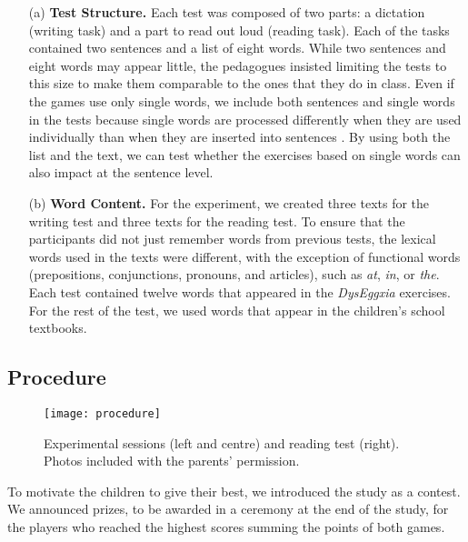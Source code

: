\documentclass[letterpaper]{sig-alternate-2013}
\begin{document}
\begin{itemize}
\item[(a)] {\bf Test Structure.} Each test was composed of two parts: a dictation (writing task) and a part to read out loud (reading task). Each of the tasks contained two sentences and a list of eight words.
While two sentences and eight words may appear little, the pedagogues insisted limiting the tests to this size to make them comparable to the ones that they do in class.
Even if the games use only single words, we include both sentences and single words in the tests because single words are processed differently when they are used individually than when they are inserted into sentences \cite{Pinker2009}.
By using both the list and the text, we can test whether the exercises based on single words can also impact at the sentence level.




\item[(b)] {\bf Word Content.} For the experiment, we created three texts for the writing test and three texts for the reading test. To ensure that the participants did not just remember words from previous tests, the lexical words used in the texts were different, with the exception of functional words (prepositions, conjunctions, pronouns, and articles), such as {\it at}, {\it in}, or {\it the}.
Each test contained twelve words that appeared in the {\it DysEggxia} exercises. For the rest of the test, we used words that appear in the children's school textbooks.

\end{itemize}



\subsection{Procedure}
\begin{figure}[tb!]
	\centering
	\texttt{[image: procedure]}
		\vspace{-0.5cm}
	\caption{Experimental sessions (left and centre) and reading test (right). Photos included with the parents' permission.}
	\label{fig:procedure}
		\vspace{-0.3cm}
\end{figure}

To motivate the children to give their best, we introduced the study as a contest.
We announced prizes, to be awarded in a ceremony at the end of the study, for the players who reached the highest scores summing the points of both games. 
\end{document}
